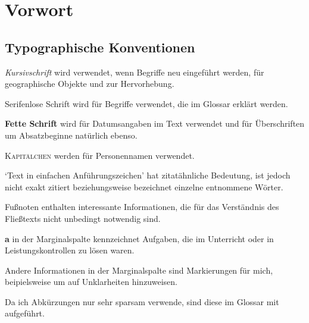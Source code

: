\chapter{Vorwort}
\label{chp:Vorwort}

\section*{Typographische Konventionen}

\begin{perldesc}
\item[\emph{Kursivschrift}]
wird verwendet, wenn Begriffe neu eingeführt werden, für geographische
Objekte und zur Hervorhebung.
\item[\textsf{Serifenlose Schrift}]
wird für Begriffe verwendet, die im Glossar erklärt werden.
\item[\textbf{Fette Schrift}]
wird für Datumsangaben im Text verwendet und für Überschriften um
Absatzbeginne natürlich ebenso.
\item[\textsc{Kapitälchen}]
werden für Personennamen verwendet.
\item[\enquote*{Text in einfachen Anführungszeichen}]
hat zitatähnliche Bedeutung, ist jedoch nicht exakt zitiert
beziehungsweise bezeichnet einzelne entnommene Wörter.
\item[Fußnoten]
enthalten interessante Informationen, die für das Verständnis des
Fließtexts nicht unbedingt notwendig sind.
\item[\textbf{\Large{a}}
in der Marginalspalte] kennzeichnet Aufgaben, die im Unterricht oder
in Leistungskontrollen zu lösen waren.
\item[Andere Informationen in der Marginalspalte]
sind Markierungen für mich, beipielsweise um auf Unklarheiten
hinzuweisen.
\end{perldesc}

Da ich Abkürzungen nur sehr sparsam verwende, sind diese im Glossar
mit aufgeführt.
